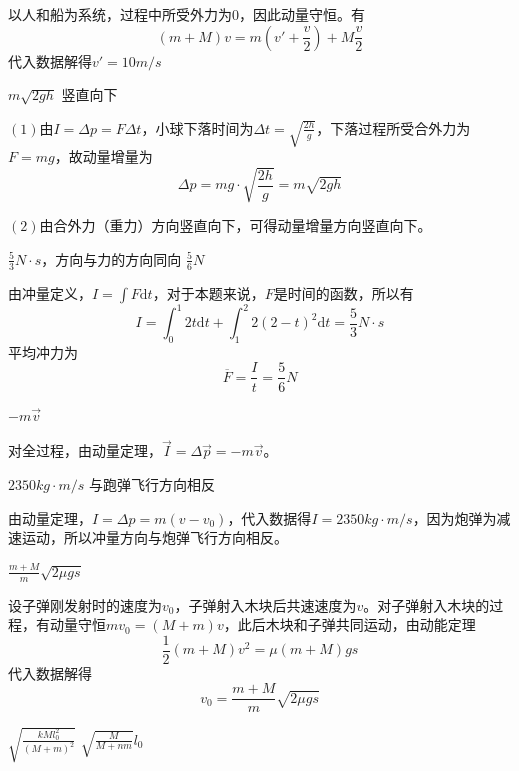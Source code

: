 \documentclass[b5paper,opensource,sourcefont,parskip]{qyxf-book}
\newcommand{\di}[1]{\mathrm{d}#1}
\begin{document}
以人和船为系统，过程中所受外力为$ 0 $，因此动量守恒。有
\begin{equation*}
(m+M)v=m(v'+\frac{v}{2})+M\frac{v}{2} 
\end{equation*}
代入数据解得$ v'=10m/s $

$ m\sqrt{2gh} $ \hspace{4em} 竖直向下

$(1)$由$ I=\Delta p=F\Delta t $，小球下落时间为$\Delta t=\sqrt{\frac{2h}{g}}$，下落过程所受合外力为$F=mg$，故动量增量为
\begin{equation*}
\Delta p=mg\cdot\sqrt{\frac{2h}{g}}=m\sqrt{2gh}
\end{equation*}

$(2)$由合外力（重力）方向竖直向下，可得动量增量方向竖直向下。

$\frac{5}{3}N\cdot s$，方向与力的方向同向 \hspace{2em} $\frac{5}{6}N$

由冲量定义，$I = \int F \di t$，对于本题来说，$F$是时间的函数，所以有
\begin{equation*}
I = \int_0^1 2t \di t + \int_1^2 2(2-t)^2 \di t = \frac{5}{3}N \cdot s
\end{equation*}
平均冲力为
\begin{equation*}
\overline{F} = \frac{I}{t} = \frac{5}{6} N
\end{equation*}

$-m\vec{v}$

对全过程，由动量定理，$\vec{I} = \Delta \vec{p} = -m\vec{v}$。

$2350kg\cdot m/s$ \hspace{2em} 与跑弹飞行方向相反

由动量定理，$I = \Delta p = m(v-v_0)$，代入数据得$I=2350kg\cdot m/s$，因为炮弹为减速运动，所以冲量方向与炮弹飞行方向相反。

$\frac{m+M}{m}\sqrt{2 \mu gs}$

设子弹刚发射时的速度为$v_0$，子弹射入木块后共速速度为$v$。对子弹射入木块的过程，有动量守恒$mv_0=(M+m)v$，此后木块和子弹共同运动，由动能定理
\begin{equation*}
\frac{1}{2}(m+M)v^2=\mu (m+M)gs
\end{equation*}
代入数据解得
\begin{equation*}
v_0=\frac{m+M}{m}\sqrt{2 \mu gs}
\end{equation*}

$\sqrt{\frac{kMl_0^2}{(M+m)^2}}$ \hspace{4em} $\sqrt{\frac{M}{M+nm}}l_0$
\end{document}
